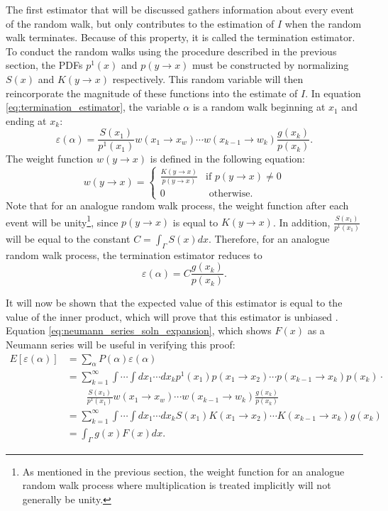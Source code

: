 The first estimator that will be discussed gathers information about every
event of the random walk, but only contributes to the estimation of $I$ when
the random walk terminates. Because of this property, it is called the
termination estimator. To conduct the random walks using the procedure
described in the previous section, the PDFs $p^1(x)$ and $p(y \to x)$ must be 
constructed by normalizing $S(x)$ and $K(y \to x)$ respectively. This random
variable will then reincorporate the magnitude of these functions into
the estimate of $I$. In equation \ref{eq:termination_estimator}, the variable 
$\alpha$ is a random walk beginning at $x_1$ and ending at $x_k$: 
\begin{equation}
  \varepsilon(\alpha) = \frac{S(x_1)}{p^1(x_1)}w(x_1 \to x_w)\cdots 
  w(x_{k-1} \to w_k)\frac{g(x_k)}{p(x_k)}.
  \label{eq:termination_estimator}
\end{equation}
The weight function $w(y \to x)$ is defined in the following equation:
\begin{equation}
  w(y \to x) = 
  \begin{cases}
    \frac{K(y \to x)}{p(y \to x)} & \text{if } p(y \to x) \neq 0 \\
    0 & \text{ otherwise}.
  \end{cases}
\end{equation}
Note that for an analogue random walk process, the weight function after each
event will be unity\footnote{As mentioned in the previous section, the weight
function for an analogue random walk process where multiplication is treated 
implicitly will not generally be unity.}, since $p(y \to x)$ is equal to 
$K(y \to x)$. In addition, $\frac{S(x_1)}{p^1(x_1)}$ will be equal to the 
constant $C = \int_{\Gamma} S(x)dx$. Therefore, for an analogue random walk 
process, the termination estimator reduces to
\begin{equation*}
  \varepsilon(\alpha) = C \frac{g(x_k)}{p(x_k)}.
\end{equation*}

It will now be shown that the expected value of this estimator is equal to the 
value of the inner product, which will prove that this estimator is unbiased 
\citep{spanier_monte_1969}. Equation \ref{eq:neumann_series_soln_expansion},
which shows $F(x)$ as a Neumann series will be useful in verifying this proof:
\begin{align}
  E\left[\varepsilon(\alpha)\right] & = \sum_{\alpha} 
  P(\alpha)\varepsilon(\alpha) \nonumber \\
  & = \sum_{k=1}^{\infty} \int \cdots \int dx_1 \cdots dx_k p^1(x_1)
  p(x_1 \to x_2) \cdots p(x_{k-1} \to x_k)p(x_k) \cdot \nonumber \\
  & \qquad \frac{S(x_1)}{p^1(x_1)}w(x_1 \to x_w)\cdots 
  w(x_{k-1} \to w_k)\frac{g(x_k)}{p(x_k)} \nonumber \\
  & = \sum_{k=1}^{\infty} \int \cdots \int dx_1 \cdots dx_k S(x_1)K(x_1 \to x_2)
  \cdots K(x_{k-1} \to x_k)g(x_k) \nonumber \\
  & = \int_{\Gamma} g(x)F(x)dx \nonumber.
\end{align}

